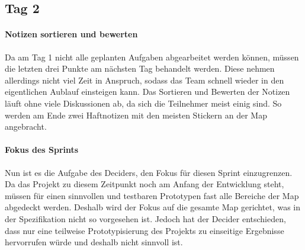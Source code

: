 \subsection*{Tag 2}
\paragraph{Notizen sortieren und bewerten}
Da am Tag 1 nicht alle geplanten Aufgaben abgearbeitet werden können, müssen die letzten drei Punkte am nächsten Tag behandelt werden. Diese nehmen allerdings nicht viel Zeit in Anspruch, sodass das Team schnell wieder in den eigentlichen Aublauf einsteigen kann. Das Sortieren und Bewerten der Notizen läuft ohne viele Diskussionen ab, da sich die Teilnehmer meist einig sind. So werden am Ende zwei Haftnotizen mit den meisten Stickern an der Map angebracht.


\paragraph{Fokus des Sprints}
Nun ist es die Aufgabe des Deciders, den Fokus für diesen Sprint einzugrenzen. Da das Projekt zu diesem Zeitpunkt noch am Anfang der Entwicklung steht, müssen für einen sinnvollen und testbaren Prototypen fast alle Bereiche der Map abgedeckt werden. Deshalb wird der Fokus auf die gesamte Map gerichtet, was in der Spezifikation nicht so vorgesehen ist. Jedoch hat der Decider entschieden, dass nur eine teilweise Prototypisierung des Projekts zu einseitige Ergebnisse hervorrufen würde und deshalb nicht sinnvoll ist.

